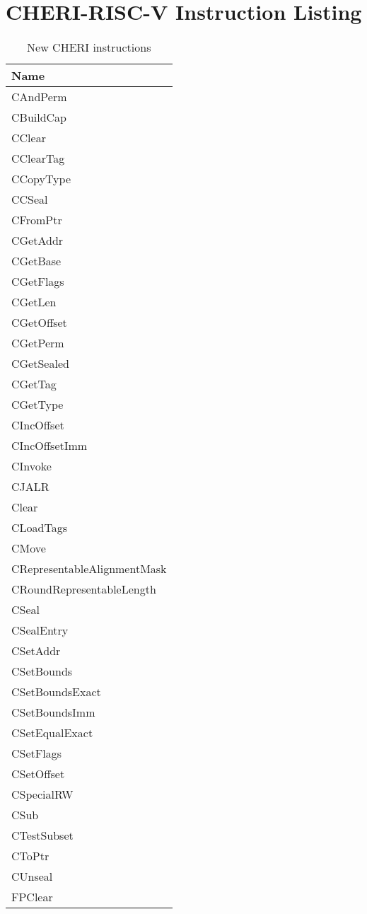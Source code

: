 \chapter{CHERI-RISC-V Instruction Listing}



\begin{table}[]
    \centering
    \begin{tabular}{l}
        \toprule
        Name \\
        \midrule
CAndPerm \\
CBuildCap \\
CClear \\
CClearTag \\
CCopyType \\
CCSeal \\
CFromPtr \\
CGetAddr \\
CGetBase \\
CGetFlags \\
CGetLen \\
CGetOffset \\
CGetPerm \\
CGetSealed \\
CGetTag \\
CGetType \\
CIncOffset \\
CIncOffsetImm \\
CInvoke \\
CJALR \\
Clear \\
CLoadTags \\
CMove \\
CRepresentableAlignmentMask \\
CRoundRepresentableLength \\
CSeal \\
CSealEntry \\
CSetAddr \\
CSetBounds \\
CSetBoundsExact \\
CSetBoundsImm \\
CSetEqualExact \\
CSetFlags \\
CSetOffset \\
CSpecialRW \\
CSub \\
CTestSubset \\
CToPtr \\
CUnseal \\
FPClear \\
        \bottomrule
    \end{tabular}
    \caption{New CHERI instructions}
    \label{tab:my_label}
\end{table}

